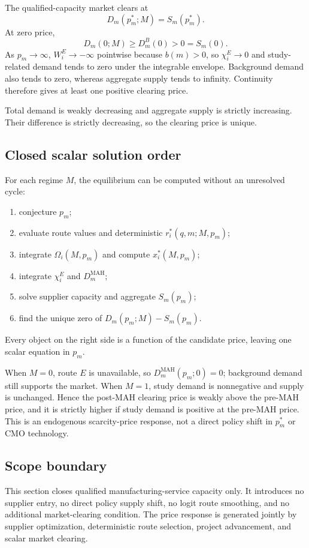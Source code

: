 The qualified-capacity market clears at
\begin{equation}
  D_m(p_m^*;M)=S_m(p_m^*).
  \label{eq:p06-market-clearing}
\end{equation}
At zero price,
\begin{equation}
  D_m(0;M)\geq D_m^B(0)>0=S_m(0).
  \label{eq:p06-existence-boundaries}
\end{equation}
As \(p_m\to\infty\), \(W_i^E\to-\infty\) pointwise because
\(b(m)>0\), so \(\chi_i^E\to0\) and study-related demand tends to zero
under the integrable envelope. Background demand also tends to zero, whereas
aggregate supply tends to infinity. Continuity therefore gives at least one
positive clearing price.

Total demand is weakly decreasing and aggregate supply is strictly
increasing. Their difference is strictly decreasing, so the clearing price
is unique.

\subsection{Closed scalar solution order}
\label{subsec:p06-solution-order}

For each regime \(M\), the equilibrium can be computed without an unresolved
cycle:
\begin{enumerate}
  \item conjecture \(p_m\);
  \item evaluate route values and deterministic \(r_i^*(q,m;M,p_m)\);
  \item integrate \(\Omega_i(M,p_m)\) and compute \(x_i^*(M,p_m)\);
  \item integrate \(\chi_i^E\) and \(D_m^{\mathrm{MAH}}\);
  \item solve supplier capacity and aggregate \(S_m(p_m)\);
  \item find the unique zero of \(D_m(p_m;M)-S_m(p_m)\).
\end{enumerate}
Every object on the right side is a function of the candidate price, leaving
one scalar equation in \(p_m\).

When \(M=0\), route \(E\) is unavailable, so
\(D_m^{\mathrm{MAH}}(p_m;0)=0\); background demand still supports the market.
When \(M=1\), study demand is nonnegative and supply is unchanged. Hence the
post-MAH clearing price is weakly above the pre-MAH price, and it is strictly
higher if study demand is positive at the pre-MAH price. This is an endogenous
scarcity-price response, not a direct policy shift in \(p_m^*\) or CMO
technology.

\subsection{Scope boundary}
\label{subsec:p06-scope}

This section closes qualified manufacturing-service capacity only. It introduces
no supplier entry, no direct policy supply shift, no logit route smoothing,
and no additional market-clearing condition. The price response is generated
jointly by supplier optimization, deterministic route selection, project
advancement, and scalar market clearing.
